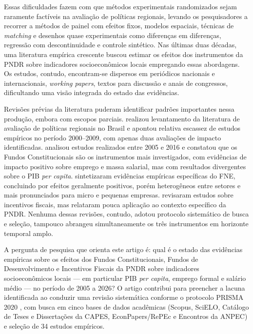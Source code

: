 Essas dificuldades fazem com que métodos experimentais randomizados sejam raramente factíveis na avaliação de políticas regionais, levando os pesquisadores a recorrer a métodos de painel com efeitos fixos, modelos espaciais, técnicas de \textit{matching} e desenhos quase experimentais como diferenças em diferenças, regressão com descontinuidade e controle sintético. Nas últimas duas décadas, uma literatura empírica crescente buscou estimar os efeitos dos instrumentos da PNDR sobre indicadores socioeconômicos locais empregando essas abordagens. Os estudos, contudo, encontram-se dispersos em periódicos nacionais e internacionais, \textit{working papers}, textos para discussão e anais de congressos, dificultando uma visão integrada do estado das evidências.

Revisões prévias da literatura puderam identificar padrões importantes nessa produção, embora com escopos parciais.  realizou levantamento da literatura de avaliação de políticas regionais no Brasil e apontou relativa escassez de estudos empíricos no período 2000--2009, com apenas duas avaliações de impacto identificadas.  analisou estudos realizados entre 2005 e 2016 e constatou que os Fundos Constitucionais são os instrumentos mais investigados, com evidências de impacto positivo sobre emprego e massa salarial, mas com resultados divergentes sobre o PIB \textit{per capita}.  sintetizaram evidências empíricas específicas do FNE, concluindo por efeitos geralmente positivos, porém heterogêneos entre setores e mais pronunciados para micro e pequenas empresas.  revisaram estudos sobre incentivos fiscais, mas relataram pouca aplicação ao contexto específico da PNDR. Nenhuma dessas revisões, contudo, adotou protocolo sistemático de busca e seleção, tampouco abrangeu simultaneamente os três instrumentos em horizonte temporal amplo.

A pergunta de pesquisa que orienta este artigo é: qual é o estado das evidências empíricas sobre os efeitos dos Fundos Constitucionais, Fundos de Desenvolvimento e Incentivos Fiscais da PNDR sobre indicadores socioeconômicos locais --- em particular PIB \textit{per capita}, emprego formal e salário médio --- no período de 2005 a 2026? O artigo contribui para preencher a lacuna identificada ao conduzir uma revisão sistemática conforme o protocolo PRISMA 2020 \cite{Page2021}, com busca em cinco bases de dados acadêmicas (Scopus, SciELO, Catálogo de Teses e Dissertações da CAPES, EconPapers/RePEc e Encontros da ANPEC) e seleção de 34 estudos empíricos.

